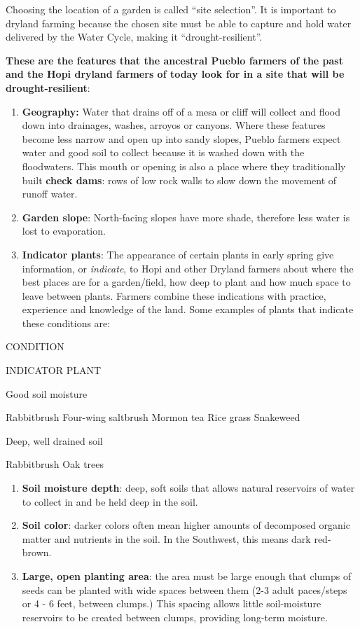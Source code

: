 \documentclass[12pt,]{article}
\providecommand{\tightlist}{%
  \setlength{\itemsep}{0pt}\setlength{\parskip}{0pt}}
\begin{document}
Choosing the location of a garden is called ``site selection''. It is important to dryland farming because the chosen site must be able to capture and hold water delivered by the Water Cycle, making it ``drought-resilient''.

\textbf{These are the features that the ancestral Pueblo farmers of the past and the Hopi dryland farmers of today look for in a site that will be drought-resilient}:

\begin{enumerate}
\def\labelenumi{\arabic{enumi}.}
\tightlist
\item
  \textbf{Geography:} Water that drains off of a mesa or cliff will collect and flood down into drainages, washes, arroyos or canyons. Where these features become less narrow and open up into sandy slopes, Pueblo farmers expect water and good soil to collect because it is washed down with the floodwaters. This mouth or opening is also a place where they traditionally built \textbf{check dams}: rows of low rock walls to slow down the movement of runoff water.
\item
  \textbf{Garden slope}: North-facing slopes have more shade, therefore less water is lost to evaporation.
\item
  \textbf{Indicator plants}: The appearance of certain plants in early spring give information, or \emph{indicate}, to Hopi and other Dryland farmers about where the best places are for a garden/field, how deep to plant and how much space to leave between plants. Farmers combine these indications with practice, experience and knowledge of the land. Some examples of plants that indicate these conditions are:
\end{enumerate}

CONDITION

INDICATOR PLANT

Good soil moisture

Rabbitbrush
Four-wing saltbrush
Mormon tea
Rice grass
Snakeweed

Deep, well drained soil

Rabbitbrush
Oak trees

\begin{enumerate}
\def\labelenumi{\arabic{enumi}.}
\tightlist
\item
  \textbf{Soil moisture depth}: deep, soft soils that allows natural reservoirs of water to collect in and be held deep in the soil.
\item
  \textbf{Soil color}: darker colors often mean higher amounts of decomposed organic matter and nutrients in the soil. In the Southwest, this means dark red-brown.
\item
  \textbf{Large, open planting area}: the area must be large enough that clumps of seeds can be planted with wide spaces between them (2-3 adult paces/steps or 4 - 6 feet, between clumps.) This spacing allows little soil-moisture reservoirs to be created between clumps, providing long-term moisture.
\end{enumerate}
\end{document}
